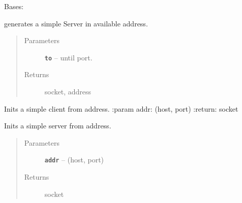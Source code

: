 \documentclass[letterpaper,10pt,english]{sphinxmanual}
\begin{document}

\begin{fulllineitems}
\label{RRtoolbox.lib:RRtoolbox.lib.serverServices.TransferExeption}
Bases: 

\end{fulllineitems}


\begin{fulllineitems}
\label{RRtoolbox.lib:RRtoolbox.lib.serverServices.generateServer}
generates a simple Server in available address.
\begin{quote}\begin{description}
\item[{Parameters}] \leavevmode
\textbf{\texttt{to}} -- until port.

\item[{Returns}] \leavevmode
socket, address

\end{description}\end{quote}

\end{fulllineitems}


\begin{fulllineitems}
\label{RRtoolbox.lib:RRtoolbox.lib.serverServices.initClient}
Inits a simple client from address.
:param addr: (host, port)
:return: socket

\end{fulllineitems}


\begin{fulllineitems}
\label{RRtoolbox.lib:RRtoolbox.lib.serverServices.initServer}
Inits a simple server from address.
\begin{quote}\begin{description}
\item[{Parameters}] \leavevmode
\textbf{\texttt{addr}} -- (host, port)

\item[{Returns}] \leavevmode
socket

\end{description}\end{quote}

\end{fulllineitems}
\end{document}
